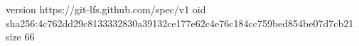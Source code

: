 version https://git-lfs.github.com/spec/v1
oid sha256:4c762dd29c8133332830a39132ce177e62c4e76c184cc759bed854be07d7cb21
size 66
